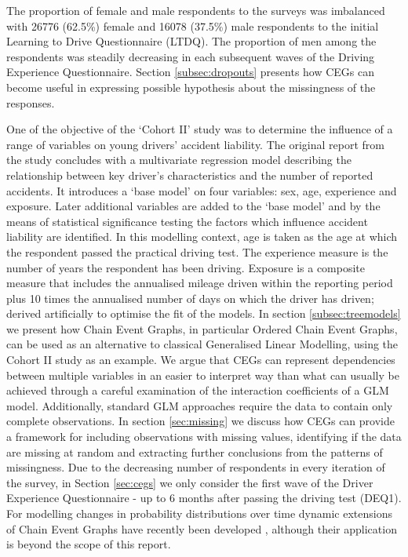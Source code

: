 \documentclass[runningheads]{llncs}
\begin{document}
The proportion of female and male respondents to the surveys was imbalanced with 26776 (62.5\%) female and 16078 (37.5\%) male respondents to the initial Learning to Drive Questionnaire (LTDQ). The proportion of men among the respondents was steadily decreasing in each subsequent waves of the Driving Experience Questionnaire. Section \ref{subsec:dropouts} presents how CEGs can become useful in expressing possible hypothesis about the missingness of the responses.

One of the objective of the `Cohort II' study was to determine the influence of a range of variables on young drivers’ accident liability. The original report from the study concludes with a multivariate regression model describing the relationship between key driver's characteristics and the number of reported accidents. It introduces a `base model' on four variables: sex, age, experience and exposure. Later additional variables are added to the `base model' and by the means of statistical significance testing the factors which influence accident liability are identified. In this modelling context, age is taken as the age at which the respondent passed the practical driving test. The experience measure is the number of years the respondent has been driving. Exposure is a composite measure that includes the annualised mileage driven within the reporting period plus 10 times the annualised number of days on which the driver has driven; derived artificially to optimise the fit of the models. 
In section \ref{subsec:treemodels} we present how Chain Event Graphs, in particular Ordered Chain Event Graphs, can be used as an alternative to classical Generalised Linear Modelling, using the Cohort II study as an example. We argue that CEGs can represent dependencies between multiple variables in an easier to interpret way than what can usually be achieved through a careful examination of the interaction coefficients of a GLM model. Additionally, standard GLM approaches require the data to contain only complete observations. In section \ref{sec:missing} we discuss how CEGs can provide a framework for including observations with missing values, identifying if the data are missing at random and extracting further conclusions from the patterns of missingness.
Due to the decreasing number of respondents in every iteration of the survey, in Section \ref{sec:cegs} we only consider the first wave of the Driver Experience Questionnaire - up to 6 months after passing the driving test (DEQ1). For modelling changes in probability distributions over time dynamic extensions of Chain Event Graphs have recently been developed \cite{barclay2015dynamic,collazo2017thesis}, although their application is beyond the scope of this report.
\end{document}
